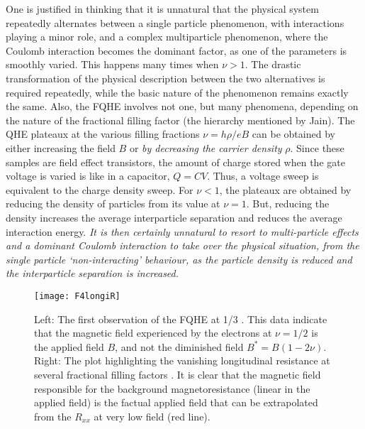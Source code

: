\documentclass[aps,preprint,12pt,tightenlines]{revtex4}%
\begin{document}
One is justified in thinking that it is unnatural that the physical system
repeatedly alternates between a single particle phenomenon, with interactions
playing a minor role, and a complex multiparticle phenomenon, where the
Coulomb interaction becomes the dominant factor, as one of the parameters is
smoothly varied. This happens many times when $\nu>1$. The drastic
transformation of the physical description between the two alternatives is
required repeatedly, while the basic nature of the phenomenon remains exactly
the same. Also, the FQHE involves not one, but many phenomena, depending on
the nature of the fractional filling factor (the hierarchy mentioned by Jain).
The QHE plateaux at the various filling fractions $\nu=h\rho/eB$ can be
obtained by either increasing the field $B$ or \emph{by decreasing the carrier
density }$\rho$. Since these samples are field effect transistors, the amount
of charge stored when the gate voltage is varied is like in a capacitor,
$Q=CV$. Thus, a voltage sweep is equivalent to the charge density sweep. For
$\nu<1$, the plateaux are obtained by reducing the density of particles from
its value at $\nu=1$. But, reducing the density increases the average
interparticle separation and reduces the average interaction energy. \emph{It
is then certainly unnatural to resort to multi-particle effects and a dominant
Coulomb interaction to take over the physical situation,  from the single
particle `non-interacting' behaviour, as the particle density is reduced and
the interparticle separation is increased.}

\begin{figure}
	\centering
	\texttt{[image: F4longiR]}
	\caption{Left: The first observation of the FQHE at 1/3 \cite{FQHE-discovery}. This data indicate that the magnetic field experienced by the electrons at $\nu=1/2$ is the applied field $B$, and not the diminished field $B^{\ast }=B(1-2\nu)$. Right: The plot highlighting the vanishing longitudinal resistance at several fractional filling factors \cite{Stormer-data}. It is clear that the magnetic field responsible for the background magnetoresistance (linear in the applied field) is the factual applied field that can be extrapolated from the $R_{xx}$ at very low field (red line).}
	\label{fig:longir}
\end{figure}
\end{document}
